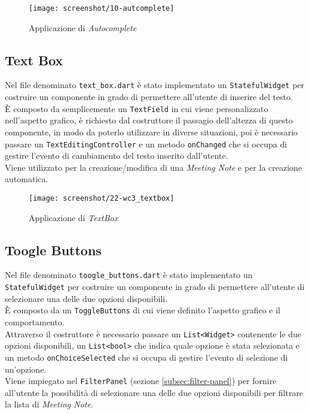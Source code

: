 \begin{figure}[!h] 
    \centering 
    \texttt{[image: screenshot/10-autcomplete]} 
    \caption{Applicazione di \emph{Autocomplete}}
    \label{fig:autocomplete}
\end{figure}

\subsection{Text Box}
\label{subsec:text-box}

Nel file denominato \lstinline{text_box.dart} è stato implementato un \lstinline{StatefulWidget} per costruire un componente in grado di permettere all'utente di inserire del testo.\\
È composto da semplicemente un \lstinline{TextField}\cite{site:text-field} in cui viene personalizzato nell'aspetto grafico, è richiesto dal costruttore il passagio dell'altezza di questo componente, in modo da poterlo utilizzare in diverse situazioni, poi è necessario passare un \lstinline{TextEditingController}\cite{site:text-editing-controller} e un metodo \lstinline{onChanged} che si occupa di gestire l'evento di cambiamento del testo inserito dall'utente.\\
Viene utilizzato per la creazione/modifica di una \emph{Meeting Note} e per la creazione automatica.

\begin{figure}[!h] 
    \centering 
    \texttt{[image: screenshot/22-wc3\_textbox]} 
    \caption{Applicazione di \emph{TextBox}}
    \label{fig:text-box}
\end{figure}

\subsection{Toogle Buttons}
\label{subsec:toogle-buttons}

Nel file denominato \lstinline{toogle_buttons.dart} è stato implementato un \lstinline{StatefulWidget} per costruire un componente in grado di permettere all'utente di selezionare una delle due opzioni disponibili.\\
È composto da un \lstinline{ToggleButtons}\cite{site:toggle-buttons} di cui viene definito l'aspetto grafico e il comportamento.\\
Attraverso il costruttore è necessario passare un \lstinline{List<Widget>} contenente le due opzioni disponibili, un \lstinline{List<bool>} che indica quale opzione è stata selezionata e un metodo \lstinline{onChoiceSelected} che si occupa di gestire l'evento di selezione di un'opzione.\\
Viene impiegato nel \lstinline{FilterPanel} (sezione \ref{subsec:filter-panel}) per fornire all'utente la possibilità di selezionare una delle due opzioni disponibili per filtrare la lista di \emph{Meeting Note}.

